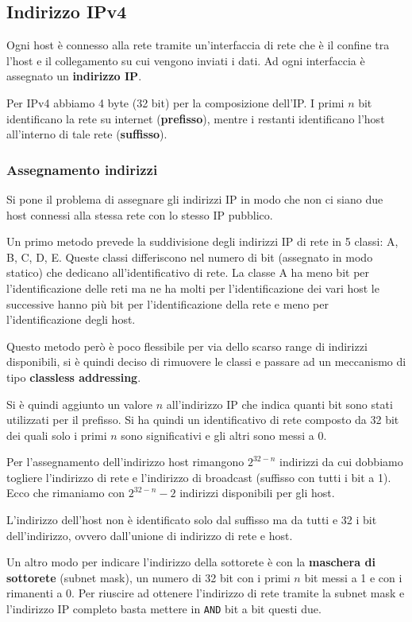 \subsection{Indirizzo IPv4}
Ogni host è connesso alla rete tramite un'interfaccia di rete che è il 
confine tra l'host e il collegamento su cui vengono inviati i dati. 
Ad ogni interfaccia è assegnato un \textbf{indirizzo IP}.

Per IPv4 abbiamo 4 byte (32 bit) per la composizione dell'IP. I primi 
$n$ bit identificano la rete su internet (\textbf{prefisso}), mentre 
i restanti identificano l'host all'interno di tale rete 
(\textbf{suffisso}).

\subsubsection{Assegnamento indirizzi}
Si pone il problema di assegnare gli indirizzi IP in modo che non ci
siano due host connessi alla stessa rete con lo stesso IP pubblico.

Un primo metodo prevede la suddivisione degli indirizzi IP di rete in 
5 classi: A, B, C, D, E. Queste classi differiscono nel numero di bit
(assegnato in modo statico) che dedicano all'identificativo di rete.
La classe A ha meno bit per l'identificazione delle reti ma ne ha
molti per l'identificazione dei vari host le successive hanno più bit 
per l'identificazione della rete e meno per l'identificazione degli
host.

Questo metodo però è poco flessibile per via dello scarso range di 
indirizzi disponibili, si è quindi deciso di rimuovere le classi e
passare ad un meccanismo di tipo \textbf{classless addressing}.

Si è quindi aggiunto un valore $n$ all'indirizzo IP che indica quanti 
bit sono stati utilizzati per il prefisso. Si ha quindi un
identificativo di rete composto da 32 bit dei quali solo i primi $n$
sono significativi e gli altri sono messi a 0.

Per l'assegnamento dell'indirizzo host rimangono $2^{32-n}$ indirizzi 
da cui dobbiamo togliere l'indirizzo di rete e l'indirizzo di broadcast
(suffisso con tutti i bit a 1). Ecco che rimaniamo con $2^{32-n}-2$
indirizzi disponibili per gli host.

L'indirizzo dell'host non è identificato solo dal suffisso ma da tutti 
e 32 i bit dell'indirizzo, ovvero dall'unione di indirizzo di rete e 
host.

Un altro modo per indicare l'indirizzo della sottorete è con la 
\textbf{maschera di sottorete} (subnet mask), un numero di 32 bit con
i primi $n$ bit messi a 1 e con i rimanenti a 0. Per riuscire ad
ottenere l'indirizzo di rete tramite la subnet mask e l'indirizzo IP
completo basta mettere in \verb|AND| bit a bit questi due.

